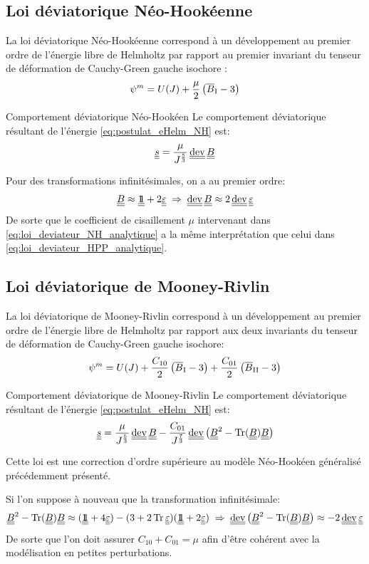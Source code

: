 \documentclass[10pt]{book}
\begin{document}
\subsection{Loi déviatorique Néo-Hookéenne}
La loi déviatorique Néo-Hookéenne correspond à un développement au premier ordre de l'énergie libre de Helmholtz par rapport au premier invariant du tenseur de déformation de Cauchy-Green gauche isochore \cite{bouteiller2023complete}:
\begin{equation}
\psi^{m} = U(J) + \dfrac{\mu}{2}\left(\overline{B}_{\mathrm{I}} -3\right)
\label{eq:postulat_eHelm_NH}
\end{equation}
\begin{Propo}{Comportement déviatorique Néo-Hookéen} Le comportement déviatorique résultant de l'énergie \eqref{eq:postulat_eHelm_NH} est:
\begin{equation}
\devia = \frac{\mu}{\J^{\frac{5}{3}}}\dev\CGG
\label{eq:loi_deviateur_NH_analytique}
\end{equation}
\end{Propo}
Pour des transformations infinitésimales, on a au premier ordre:
$$\CGG \approx \TenUnit + 2\DefoHPP \implique \dev\CGG \approx 2\dev\DefoHPP$$
De sorte que le coefficient de cisaillement $\mu$ intervenant dans \eqref{eq:loi_deviateur_NH_analytique} a la même interprétation que celui dans \eqref{eq:loi_deviateur_HPP_analytique}.
\subsection{Loi déviatorique de Mooney-Rivlin}
La loi déviatorique de Mooney-Rivlin correspond à un développement au premier ordre de l'énergie libre de Helmholtz par rapport aux deux invariants du tenseur de déformation de Cauchy-Green gauche isochore:
\begin{equation}
\psi^{m} = U(J) + \dfrac{C_{10}}{2}\left(\overline{B}_{\mathrm{I}} -3\right)+ \dfrac{C_{01}}{2}\left(\overline{B}_{\mathrm{II}} -3\right)
\label{eq:postulat_eHelm_NH}
\end{equation}
\begin{Propo}{Comportement déviatorique de Mooney-Rivlin} Le comportement déviatorique résultant de l'énergie \eqref{eq:postulat_eHelm_NH} est:
$$\devia=\dfrac{\mu}{\J^{\frac{5}{3}}}\dev\CGG-\dfrac{C_{01}}{\J^\frac{7}{3}}\dev\left(\CGG^{2}-\tr(\CGG)\CGG\right)$$
\end{Propo}
Cette loi est une correction d'ordre supérieure au modèle Néo-Hookéen généralisé précédemment présenté. 

Si l'on suppose à nouveau que la transformation infinitésimale:
$$\CGG^{2}-\tr(\CGG)\CGG\approx (\TenUnit+4\DefoHPP) - (3+2\tr\DefoHPP)(\TenUnit+2\DefoHPP) \implique \dev\left(\CGG^{2}-\tr(\CGG)\CGG\right)\approx -2\dev\DefoHPP$$
De sorte que l'on doit assurer $C_{10}+C_{01}=\mu$ afin d'être cohérent avec la modélisation en petites perturbations.
\end{document}
